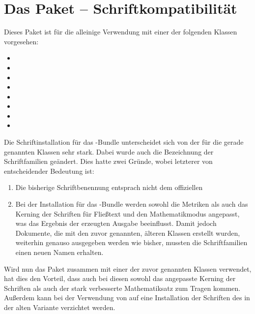 \section{Das Paket  -- Schriftkompatibilität}
\begin{Bundle*}[v2.05]{}
\printchangedatlist%
%
Dieses Paket ist für die alleinige Verwendung mit einer der folgenden Klassen 
vorgesehen:
\begin{itemize}
\item {}
\item {}
\item {}
\item {}
\item {}
\item {}
\item {}
\item {}
\end{itemize}
%
Die Schriftinstallation für das \TUDScript-Bundle unterscheidet sich von der 
für die gerade genannten Klassen sehr stark. Dabei wurde auch die Bezeichnung 
der Schriftfamilien geändert. Dies hatte zwei Gründe, wobei letzterer von 
entscheidender Bedeutung ist:
%
\begin{enumerate}
\item
  Die bisherige Schriftbenennung entsprach nicht dem offiziellen 
\item
  Bei der Installation für das \TUDScript-Bundle werden sowohl die Metriken
  als auch das Kerning der Schriften für Fließtext und den Mathematikmodus 
  angepasst, was das Ergebnis der erzeugten Ausgabe beeinflusst. Damit jedoch
  Dokumente, die mit den zuvor genannten, älteren Klassen erstellt wurden, 
  weiterhin genauso ausgegeben werden wie bisher, mussten die Schriftfamilien 
  einen neuen Namen erhalten.
\end{enumerate}
%
Wird nun das Paket  zusammen mit einer der zuvor 
genannten Klassen verwendet, hat dies den Vorteil, dass auch bei diesen sowohl 
das angepasste Kerning der Schriften als auch der stark verbesserte 
Mathematiksatz zum Tragen kommen. Außerdem kann bei der Verwendung von 
 auf eine Installation der Schriften des \CDs in der 
alten Variante verzichtet werden.
\end{Bundle*}
